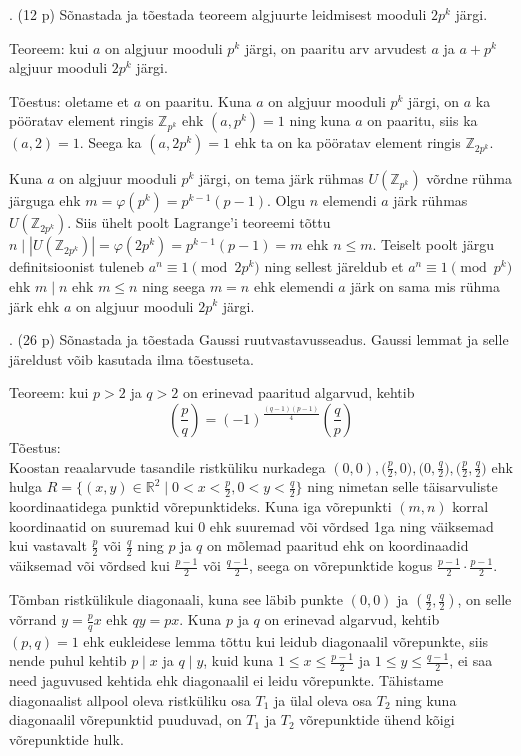 \documentclass[a4paper, 10pt]{article}
\newcommand{\Z}{\mathbb{Z}}
\newcommand{\leg}[2]{\left(\frac{#1}{#2}\right)}
\begin{document}
. (12 p) Sõnastada ja tõestada teoreem algjuurte leidmisest mooduli $2p^k$ järgi.

\bigskip
Teoreem: kui $a$ on algjuur mooduli $p^k$ järgi, on paaritu arv arvudest $a$ ja $a+p^k$ algjuur mooduli $2p^k$ järgi.

Tõestus: oletame et $a$ on paaritu. Kuna $a$ on algjuur mooduli $p^k$ järgi, on $a$ ka pööratav element ringis $\Z_{p^k}$  ehk $(a,p^k)=1$ ning kuna $a$ on paaritu, siis ka $(a,2)=1$. Seega ka $(a,2p^k)=1$ ehk ta on ka pööratav element ringis $\Z_{2p^k}$.

Kuna $a$ on algjuur mooduli $p^k$ järgi, on tema järk rühmas $U(\Z_{p^k})$ võrdne rühma järguga ehk $m=\varphi(p^k)=p^{k-1}(p-1)$. Olgu $n$ elemendi $a$ järk rühmas $U(\Z_{2p^k})$. Siis ühelt poolt Lagrange'i teoreemi tõttu \mbox{$n\mid |U(\Z_{2p^k})|=\varphi(2p^k)=p^{k-1}(p-1)=m$} ehk $n\leq m$. Teiselt poolt järgu definitsioonist tuleneb $a^n\equiv1\pmod{2p^k}$ ning sellest järeldub et $a^n\equiv1\pmod{p^k}$ ehk $m\mid n$ ehk $m\leq n$ ning seega $m=n$ ehk elemendi $a$ järk on sama mis rühma järk ehk $a$ on algjuur mooduli $2p^k$ järgi.
\bigskip

\pagebreak

. (26 p) Sõnastada ja tõestada Gaussi ruutvastavusseadus. Gaussi lemmat ja selle järeldust võib kasutada ilma tõestuseta. 

\bigskip
Teoreem: kui $p>2$ ja $q>2$ on erinevad paaritud algarvud, kehtib $$\leg{p}{q}=(-1)^{\frac{(q-1)(p-1)}4}\leg{q}{p}$$
Tõestus:\\
Koostan reaalarvude tasandile ristküliku nurkadega $(0,0),\Big(\frac p2,0\Big),\Big(0,\frac q2\Big),\Big(\frac p2,\frac q2\Big)$ ehk hulga $R=\Big\{(x,y)\in\mathbb R^2\mid0<x<\frac p2,0<y<\frac q2\Big\}$ ning nimetan selle täisarvuliste koordinaatidega punktid võrepunktideks. Kuna iga võrepunkti $(m,n)$ korral koordinaatid on suuremad kui 0 ehk suuremad või võrdsed 1ga ning väiksemad kui vastavalt $\frac p2$ või $\frac q2$ ning $p$ ja $q$ on mõlemad paaritud ehk on koordinaadid väiksemad või võrdsed kui $\frac {p-1}2$ või $\frac {q-1}2$, seega on võrepunktide kogus $\frac {p-1}2\cdot\frac {p-1}2$.

Tõmban ristkülikule diagonaali, kuna see läbib punkte $(0,0)$ ja $(\frac q2, \frac q2)$, on selle võrrand $y=\frac{p}{q}x$ ehk $qy=px$. Kuna $p$ ja $q$ on erinevad algarvud, kehtib $(p,q)=1$ ehk eukleidese lemma tõttu kui leidub diagonaalil võrepunkte, siis nende puhul kehtib $p\mid x$ ja $q\mid y$, kuid kuna $1\leq x \leq \frac{p-1}2$ ja $1\leq y \leq \frac{q-1}2$, ei saa need jaguvused kehtida ehk diagonaalil ei leidu võrepunkte. Tähistame diagonaalist allpool oleva ristküliku osa $T_1$ ja ülal oleva osa $T_2$ ning kuna diagonaalil võrepunktid puuduvad, on $T_1$ ja $T_2$ võrepunktide ühend kõigi võrepunktide hulk.
\end{document}
